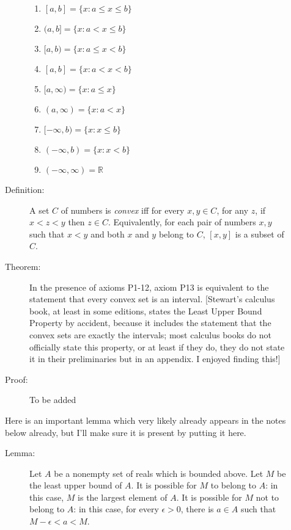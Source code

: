 \documentclass[12pt]{article}
\begin{document}
\begin{description}
\begin{description}
\begin{enumerate}

\item $[a,b] = \{x : a \leq x \leq b\}$
\item $(a,b] = \{x : a < x \leq b\}$
\item $[a,b) = \{x : a \leq x < b\}$
\item $[a,b] = \{x : a < x < b\}$
\item $[a,\infty)= \{x : a \leq x \}$
\item $(a,\infty)= \{x : a < x \}$
\item $[-\infty,b)=\{x:x \leq b\}$
\item $(-\infty,b)=\{x:x < b\}$
\item $(-\infty,\infty)={\mathbb R}$

\end{enumerate}

\item[Definition:]  A set $C$ of numbers is {\em convex\/} iff for every $x,y \in C$, for any $z$, if $x < z < y$ then $z \in C$.   Equivalently, for
each pair of numbers $x,y$ such that $x<y$ and both $x$ and $y$ belong to $C$, $[x,y]$ is a subset of $C$.

\item[Theorem:]  In the presence of axioms P1-12, axiom P13 is equivalent to the statement that every convex set is an interval.    [Stewart's calculus book, at least in some editions, states the Least Upper Bound Property by accident, because it includes the statement that the convex sets are exactly the intervals; most calculus books do not officially state this property, or at least if they do, they do not state it in their preliminaries but in an appendix.   I enjoyed finding this!]

\item[Proof:]  To be added

\end{description}

Here is an important lemma which very likely already appears in the notes below already, but I'll make sure it is present by putting it here.

\begin{description}


\item[Lemma:]  Let $A$ be a nonempty set of reals which is bounded above.  Let $M$ be the least upper bound of $A$.   It is possible for $M$ to belong to $A$:
in this case, $M$ is the largest element of $A$.   It is possible for $M$ not to belong to $A$:  in this case, for every $\epsilon>0$, there is $a \in A$ such that
$M-\epsilon < a < M$.


\end{description}
\end{description}
\end{document}
